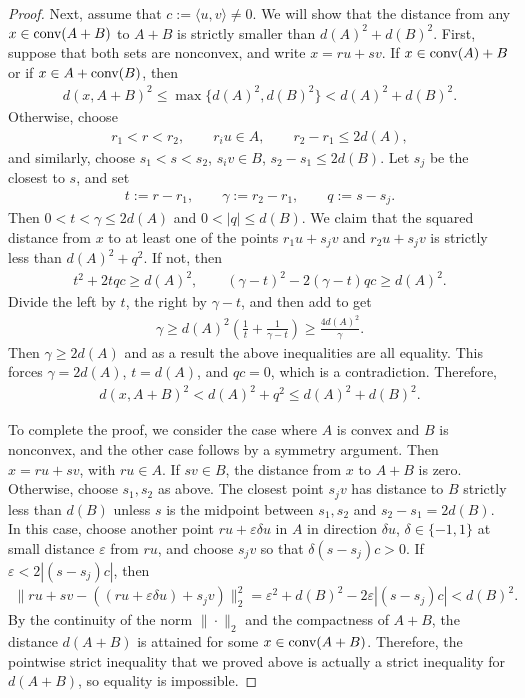 \documentclass[11pt]{article}
\begin{document}
\begin{proof}
    Next, assume that $c:=\langle u,v\rangle \neq 0$. We will show that the distance from any $x\in \textup{conv}(A+B)$ to $A+B$ is strictly smaller than $d(A)^2+d(B)^2$. First, suppose that both sets are nonconvex, and write $x=ru+sv$. If $x\in \textup{conv}(A)+B$ or if $x\in A+\textup{conv}(B)$, then
    \begin{align*}
        d(x,A+B)^2\leq \max\{d(A)^2,d(B)^2\}<d(A)^2+d(B)^2.
    \end{align*}
    Otherwise, choose
    \begin{align*}
        r_1<r<r_2,\qquad r_iu\in A,\qquad r_2-r_1\leq 2d(A),
    \end{align*}
    and similarly, choose $s_1< s< s_2$, $s_iv\in B$, $s_2-s_1\leq 2d(B)$. Let $s_j$ be the closest to $s$, and set
    \begin{align*}
        t:=r-r_1,\qquad \gamma:=r_2-r_1,\qquad q:=s-s_j.
    \end{align*}
    Then $0<t<\gamma \leq 2d(A)$ and $0<|q|\leq d(B)$. We claim that the squared distance from $x$ to at least one of the points $r_1u+s_jv$ and $r_2u+s_jv$ is strictly less than $d(A)^2+q^2$. If not, then
    \begin{align*}
        t^2+2tqc\geq d(A)^2,\qquad (\gamma-t)^2-2(\gamma-t)qc\geq d(A)^2.
    \end{align*}
    Divide the left by $t$, the right by $\gamma-t$, and then add to get
    \begin{align*}
        \gamma\geq d(A)^2\left(\frac{1}{t}+\frac{1}{\gamma-t}\right)\geq\frac{4d(A)^2}{\gamma}.
    \end{align*}
    Then $\gamma\geq 2d(A)$ and as a result the above inequalities are all equality. This forces $\gamma=2d(A)$, $t=d(A)$, and $qc=0$, which is a contradiction. Therefore,
    \begin{align*}
        d(x,A+B)^2<d(A)^2+q^2\leq d(A)^2+d(B)^2.
    \end{align*}

    To complete the proof, we consider the case where $A$ is convex and $B$ is nonconvex, and the other case follows by a symmetry argument. Then $x=ru+sv$, with $ru\in A$. If $sv\in B$, the distance from $x$ to $A+B$ is zero. Otherwise, choose $s_1,s_2$ as above. The closest point $s_jv$ has distance to $B$ strictly less than $d(B)$ unless $s$ is the midpoint between $s_1,s_2$ and $s_2-s_1=2d(B)$. In this case, choose another point $ru+\varepsilon \delta u$ in $A$ in direction $\delta u$, $\delta\in \{-1,1\}$ at small distance $\varepsilon$ from $ru$, and choose $s_jv$ so that $\delta(s-s_j)c>0$. If $\varepsilon <2|(s-s_j)c|$, then
    \begin{align*}
        \|ru+sv-((ru+\varepsilon \delta u )+s_jv)\|_2^2=\varepsilon^2+d(B)^2-2\varepsilon|(s-s_j)c|<d(B)^2.
    \end{align*}
    By the continuity of the norm $\|\cdot \|_2$ and the compactness of $A+B$, the distance $d(A+B)$ is attained for some $x\in \textup{conv}(A+B)$. Therefore, the pointwise strict inequality that we proved above is actually a strict inequality for $d(A+B)$, so equality is impossible.
\end{proof}
\end{document}
